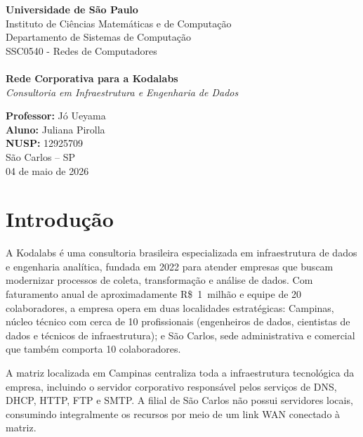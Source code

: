 \documentclass[12pt,a4paper]{article}
\begin{document}
\begin{titlepage}
    \centering
    \vspace*{1.5cm}

    {\LARGE \textbf{Universidade de São Paulo}}\\[0.3cm]
    {\large Instituto de Ciências Matemáticas e de Computação}\\[0.2cm]
    {\large Departamento de Sistemas de Computação}\\[0.2cm]
    {\large SSC0540 - Redes de Computadores}\\[3.5cm]

    {\Huge \textbf{ 
}}\\[0.8cm]
    {\LARGE \textbf{Rede Corporativa para a Kodalabs}}\\[0.3cm]
    {\large \textit{Consultoria em Infraestrutura e Engenharia de Dados}}\\[5cm]

    \vfill

    {\large \textbf{Professor:} Jó Ueyama}\\[0.3cm]
    {\large \textbf{Aluno:} Juliana Pirolla}\\[0.2cm]
    {\large \textbf{NUSP:} 12925709}\\[2cm]

    {\large São Carlos -- SP}\\
    {\large 04 de maio de 2026}
\end{titlepage}

\tableofcontents
\newpage

\section{Introdução}

A Kodalabs é uma consultoria brasileira especializada em infraestrutura de dados e
engenharia analítica, fundada em 2022 para atender empresas que buscam modernizar
processos de coleta, transformação e análise de dados. Com faturamento anual de
aproximadamente R\$~1~milhão e equipe de 20 colaboradores, a empresa opera em
duas localidades estratégicas: Campinas, núcleo técnico com
cerca de 10 profissionais (engenheiros de dados, cientistas de dados e técnicos de
infraestrutura); e São Carlos, sede administrativa e comercial que também comporta 10 colaboradores.

A matriz localizada em Campinas centraliza toda a infraestrutura tecnológica da empresa, incluindo o servidor corporativo responsável pelos serviços de DNS, DHCP, HTTP, FTP e SMTP. A filial de São Carlos não possui servidores locais, consumindo integralmente os recursos por meio de um link WAN conectado à matriz.
\end{document}
